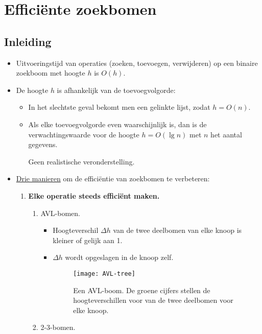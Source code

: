 \chapter{Efficiënte zoekbomen}
\section{Inleiding}
\begin{itemize}
    \item Uitvoeringstijd van operaties (zoeken, toevoegen, verwijderen) op een binaire zoekboom met hoogte $h$ is $O(h)$.
    \item De hoogte $h$ is afhankelijk van de toevoegvolgorde:
    \begin{itemize}
        \item In het slechtste geval bekomt men een gelinkte lijst, zodat $h = O(n)$.
        \item Als elke toevoegvolgorde even waarschijnlijk is, dan is de verwachtingswaarde voor de hoogte $h = O(\lg n)$ met $n$ het aantal gegevens.
        \begin{itemize}
            \alert Geen realistische veronderstelling.
        \end{itemize}
    \end{itemize}
    \item \underline{Drie manieren} om de efficiëntie van zoekbomen te verbeteren:
    \begin{enumerate}
        \item \textbf{Elke operatie steeds efficiënt maken.}
        \begin{enumerate}
            \item AVL-bomen.
            \begin{itemize}
                \item Hoogteverschil $\Delta h$ van de twee deelbomen van elke knoop is kleiner of gelijk aan 1.
                \item $\Delta h$ wordt opgeslagen in de knoop zelf.
                \begin{figure}[ht]
                    \centering
                    \texttt{[image: AVL-tree]}
                    \caption{Een AVL-boom. De groene cijfers stellen de hoogteverschillen voor van de twee deelbomen voor elke knoop.}
                    \label{fig:AVL-tree}
                \end{figure}
            \end{itemize}
            \item 2-3-bomen.

\end{enumerate}
\end{enumerate}
\end{itemize}
